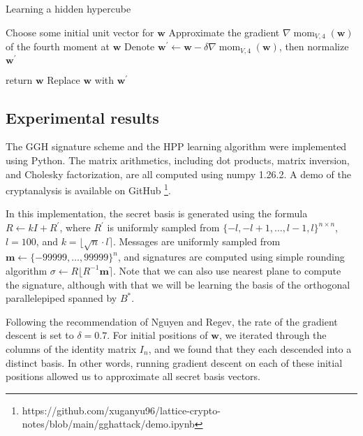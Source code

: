\begin{algorithm}\label{algo-learning-hypercube}
\caption{Learning a hidden hypercube}
\begin{algorithmic}[1]
    \State Choose some initial unit vector for $\mathbf{w}$
        \State Approximate the gradient $\nabla \operatorname{mom}_{V, 4}(\mathbf{w})$ of the fourth moment at $\mathbf{w}$
        \State Denote $\mathbf{w}^\prime \leftarrow \mathbf{w} - \delta \nabla \operatorname{mom}_{V, 4}(\mathbf{w})$, then normalize $\mathbf{w}^\prime$
        
            \State return $\mathbf{w}$
        \Else
            \State Replace $\mathbf{w}$ with $\mathbf{w}^\prime$
        \EndIf 
    \EndWhile
\end{algorithmic}
\end{algorithm}

\subsection{Experimental results}
The GGH signature scheme and the HPP learning algorithm were implemented using Python. The matrix arithmetics, including dot products, matrix inversion, and Cholesky factorization, are all computed using numpy 1.26.2. A demo of the cryptanalysis is available on GitHub \footnote{https://github.com/xuganyu96/lattice-crypto-notes/blob/main/gghattack/demo.ipynb}.

In this implementation, the secret basis is generated using the formula $R \leftarrow kI + R^\prime$, where $R^\prime$ is uniformly sampled from $\{-l, -l + 1, \ldots, l-1, l\}^{n \times n}$, $l = 100$, and $k = \lfloor \sqrt{n} \cdot l \rceil$. Messages are uniformly sampled from $\mathbf{m} \leftarrow \{-99999, \ldots, 99999\}^n$, and signatures are computed using simple rounding algorithm $\sigma \leftarrow R \lfloor R^{-1}\mathbf{m} \rceil$. Note that we can also use nearest plane to compute the signature, although with that we will be learning the basis of the orthogonal parallelepiped spanned by $B^\ast$.

Following the recommendation of Nguyen and Regev, the rate of the gradient descent is set to $\delta = 0.7$. For initial positions of $\mathbf{w}$, we iterated through the columns of the identity matrix $I_n$, and we found that they each descended into a distinct basis. In other words, running gradient descent on each of these initial positions allowed us to approximate all secret basis vectors.

